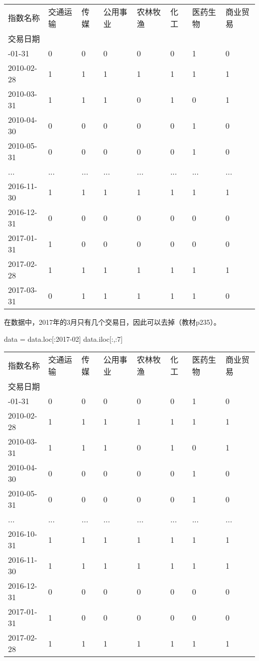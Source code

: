 \documentclass[
  letterpaper,
  DIV=11,
  numbers=noendperiod]{scrreprt}
\newenvironment{Shaded}{\begin{snugshade}}{\end{snugshade}}
\newcommand{\DecValTok}[1]{\textcolor[rgb]{0.68,0.00,0.00}{#1}}
\newcommand{\NormalTok}[1]{\textcolor[rgb]{0.00,0.23,0.31}{#1}}
\newcommand{\OperatorTok}[1]{\textcolor[rgb]{0.37,0.37,0.37}{#1}}
\newcommand{\StringTok}[1]{\textcolor[rgb]{0.13,0.47,0.30}{#1}}
\begin{document}
\begin{longtable}[]{@{}llllllll@{}}
\toprule\noalign{}
指数名称 & 交通运输 & 传媒 & 公用事业 & 农林牧渔 & 化工 & 医药生物 &
商业贸易 \\
交易日期 & & & & & & & \\
\midrule\noalign{}
\endhead
\bottomrule\noalign{}
\endlastfoot
2010-01-31 & 0 & 0 & 0 & 0 & 0 & 1 & 0 \\
2010-02-28 & 1 & 1 & 1 & 1 & 1 & 1 & 1 \\
2010-03-31 & 1 & 1 & 1 & 0 & 1 & 0 & 1 \\
2010-04-30 & 0 & 0 & 0 & 0 & 0 & 1 & 0 \\
2010-05-31 & 0 & 0 & 0 & 0 & 0 & 1 & 0 \\
... & ... & ... & ... & ... & ... & ... & ... \\
2016-11-30 & 1 & 1 & 1 & 1 & 1 & 1 & 1 \\
2016-12-31 & 0 & 0 & 0 & 0 & 0 & 0 & 0 \\
2017-01-31 & 1 & 0 & 0 & 0 & 0 & 0 & 0 \\
2017-02-28 & 1 & 1 & 1 & 1 & 1 & 1 & 1 \\
2017-03-31 & 0 & 1 & 1 & 1 & 1 & 1 & 0 \\
\end{longtable}

在数据中，2017年的3月只有几个交易日，因此可以去掉（教材p235）。

\begin{Shaded}
\begin{Highlighting}[]
\NormalTok{data }\OperatorTok{=}\NormalTok{ data.loc[:}\StringTok{\textquotesingle{}2017{-}02\textquotesingle{}}\NormalTok{]}
\NormalTok{data.iloc[:,:}\DecValTok{7}\NormalTok{]}
\end{Highlighting}
\end{Shaded}

\begin{longtable}[]{@{}llllllll@{}}
\toprule\noalign{}
指数名称 & 交通运输 & 传媒 & 公用事业 & 农林牧渔 & 化工 & 医药生物 &
商业贸易 \\
交易日期 & & & & & & & \\
\midrule\noalign{}
\endhead
\bottomrule\noalign{}
\endlastfoot
2010-01-31 & 0 & 0 & 0 & 0 & 0 & 1 & 0 \\
2010-02-28 & 1 & 1 & 1 & 1 & 1 & 1 & 1 \\
2010-03-31 & 1 & 1 & 1 & 0 & 1 & 0 & 1 \\
2010-04-30 & 0 & 0 & 0 & 0 & 0 & 1 & 0 \\
2010-05-31 & 0 & 0 & 0 & 0 & 0 & 1 & 0 \\
... & ... & ... & ... & ... & ... & ... & ... \\
2016-10-31 & 1 & 1 & 1 & 1 & 1 & 1 & 1 \\
2016-11-30 & 1 & 1 & 1 & 1 & 1 & 1 & 1 \\
2016-12-31 & 0 & 0 & 0 & 0 & 0 & 0 & 0 \\
2017-01-31 & 1 & 0 & 0 & 0 & 0 & 0 & 0 \\
2017-02-28 & 1 & 1 & 1 & 1 & 1 & 1 & 1 \\
\end{longtable}
\end{document}
